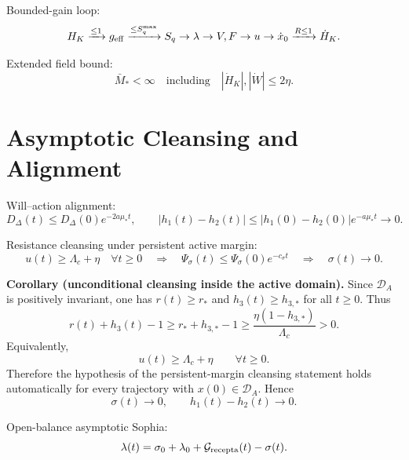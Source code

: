 \documentclass[11pt,a4paper]{article}
\newcommand{\DA}{\mathcal D_A}
\newcommand{\Grec}{\mathcal G_{\rm recepta}}
\theoremstyle{plain}
\theoremstyle{definition}
\theoremstyle{remark}
\begin{document}
Bounded-gain loop:
\begin{equation}
  H_K\xrightarrow{\le1}g_{\rm eff}
  \xrightarrow{\le S_q^{\max}}S_q
  \to\lambda\to V,F\to u\to\dot x_0
  \xrightarrow{R\le1}\dot H_K.
\end{equation}

Extended field bound:
\begin{equation}
  \bar M_*<\infty
  \quad\text{including}\quad
  |\dot H_K|,|\dot W|\le2\eta.
\end{equation}

\section{Asymptotic Cleansing and Alignment}

Will--action alignment:
\begin{equation}
  D_\Delta(t)\le D_\Delta(0)e^{-2a\mu_*t},
  \qquad
  |h_1(t)-h_2(t)|\le |h_1(0)-h_2(0)|e^{-a\mu_*t}\to0.
\end{equation}

Resistance cleansing under persistent active margin:
\begin{equation}
  u(t)\ge\Lambda_c+\eta\quad\forall t\ge0
  \quad\Longrightarrow\quad
  \Psi_\sigma(t)\le\Psi_\sigma(0)e^{-c_\sigma t}
  \quad\Longrightarrow\quad
  \sigma(t)\to0.
\end{equation}

\textbf{Corollary (unconditional cleansing inside the active domain).}
Since \(\DA\) is positively invariant, one has \(r(t)\ge r_*\) and
\(h_3(t)\ge h_{3,*}\) for all \(t\ge0\). Thus
\begin{equation}
  r(t)+h_3(t)-1
  \ge
  r_*+h_{3,*}-1
  \ge
  \frac{\eta(1-h_{3,*})}{\Lambda_c}>0.
\end{equation}
Equivalently,
\begin{equation}
  u(t)\ge\Lambda_c+\eta
  \qquad\forall t\ge0.
\end{equation}
Therefore the hypothesis of the persistent-margin cleansing statement holds automatically for every trajectory with \(x(0)\in\DA\). Hence
\begin{equation}
  \sigma(t)\to0,
  \qquad
  h_1(t)-h_2(t)\to0.
\end{equation}

Open-balance asymptotic Sophia:
\begin{equation}
  \lambda(t)=\sigma_0+\lambda_0+\Grec(t)-\sigma(t).
\end{equation}
\end{document}
